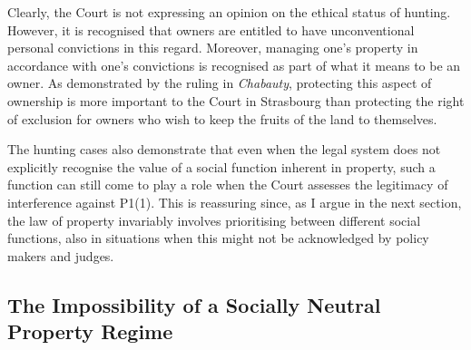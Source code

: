 Clearly, the Court is not expressing an opinion on the ethical status of hunting. However, it is recognised that owners are entitled to have unconventional personal convictions in this regard. Moreover, managing one's property in accordance with one's convictions is recognised as part of what it means to be an owner. As demonstrated by the ruling in {\it Chabauty}, protecting this aspect of ownership is more important to the Court in Strasbourg than protecting the right of exclusion for owners who wish to keep the fruits of the land to themselves.

The hunting cases also demonstrate that even when the legal system does not explicitly recognise the value of a social function inherent in property, such a function can still come to play a role when the Court assesses the legitimacy of interference against P1(1). This is reassuring since, as I argue in the next section, the law of property invariably involves prioritising between different social functions, also in situations when this might not be acknowledged by policy makers and judges.

\subsection{The Impossibility of a Socially Neutral Property Regime}\label{sec:2:4:2}

